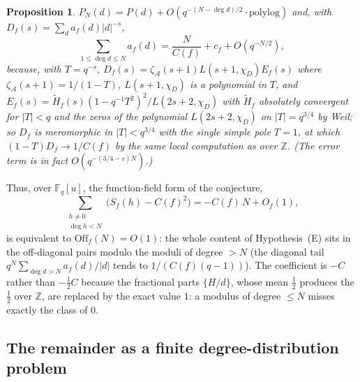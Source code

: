 \documentclass[11pt,a4paper]{article}
\newtheorem{proposition}[theorem]{Proposition}
\newcommand{\Z}{\mathbb{Z}}
\newcommand{\F}{\mathbb{F}}
\newcommand{\A}{\mathcal A}
\begin{document}
\begin{proposition}\label{prop:B2}
$P_N(d)=P(d)+O(q^{-(N-\deg d)/2}\cdot\text{polylog})$ and, with $D_f(s)=\sum_da_f(d)|d|^{-s}$,
\[
\sum_{1\le\deg d\le N}a_f(d)=\frac N{C(f)}+c_f+O(q^{-N/2}),
\]
because, with $T=q^{-s}$, $D_f(s)=\zeta_\A(s+1)L(s+1,\chi_D)E_f(s)$ where $\zeta_\A(s+1)=1/(1-T)$,
$L(s+1,\chi_D)$ is a polynomial in $T$, and $E_f(s)=\tilde H_f(s)(1-q^{-1}T^2)^2/L(2s+2,\chi_D)$ with
$\tilde H_f$ absolutely convergent for $|T|<q$ and the zeros of the polynomial $L(2s+2,\chi_D)$ on
$|T|=q^{3/4}$ by Weil; so $D_f$ is meromorphic in $|T|<q^{3/4}$ with the single simple pole $T=1$, at which
$(1-T)D_f\to1/C(f)$ by the same local computation as over $\Z$. (The error term is in fact
$O(q^{-(3/4-\varepsilon)N})$.)
\end{proposition}

Thus, over $\F_q[u]$, the function-field form of the conjecture,
\begin{equation}\label{eq:ffconj}
\sum_{\substack{h\ne0\\\deg h<N}}\bigl(S_f(h)-C(f)^2\bigr)=-C(f)\,N+O_f(1),
\end{equation}
is equivalent to $\mathrm{Off}_f(N)=O(1)$: the whole content of Hypothesis~(E) sits in the off-diagonal
pairs modulo the moduli of degree $>N$ (the diagonal tail $q^N\sum_{\deg d>N}a_f(d)/|d|$ tends to
$1/(C(f)(q-1))$). The coefficient is $-C$ rather than $-\tfrac12C$ because the fractional parts $\{H/d\}$,
whose mean $\tfrac12$ produces the $\tfrac12$ over $\Z$, are replaced by the exact value $1$: a modulus of
degree $\le N$ misses exactly the class of $0$.

\subsection{The remainder as a finite degree-distribution problem}
\end{document}
